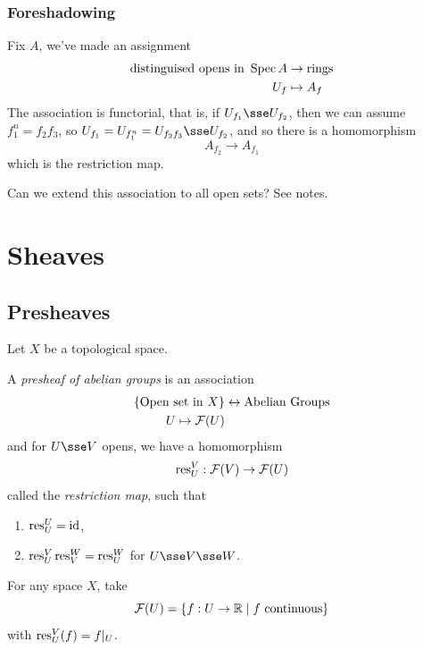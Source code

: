 \documentclass{article}
\begin{document}
\subsubsection*{Foreshadowing}

Fix \(A\), we've made an assignment
\begin{align*}
    \text{distinguised opens in }\operatorname{Spec} A &\to \text{rings} \\
    U_f &\mapsto A_f
\end{align*}
The association is functorial, that is, if \(U_{f_1} \sse U_{f_2}\), then we can assume \(f_1^n = f_2f_3\), so \(U_{f_1} = U_{f_1^n} = U_{f_2f_3} \sse U_{f_2}\), and so there is a homomorphism
\[A_{f_2} \to A_{f_1}\]
which is the restriction map.

Can we extend this association to all open sets? See notes.

\section{Sheaves}

\subsection{Presheaves}

Let \(X\) be a topological space.

\begin{definition}
    [presheaf] A \emph{presheaf of abelian groups} is an association
    \begin{align*}
        \left\{\text{Open set in }X\right\} &\leftrightarrow \text{Abelian Groups} \\
        U \mapsto \mathcal{F}(U)
    \end{align*}
    and for \(U \sse V\) opens, we have a homomorphism
    \[\operatorname{res}_U^V : \mathcal{F}(V) \to \mathcal{F}(U)\]
    called the \emph{restriction map}, such that
    \begin{enumerate}
        \item \(\operatorname{res}_U^U = \operatorname{id}\),
        \item \(\operatorname{res}^V_U\operatorname{res}^W_V = \operatorname{res}^W_U\) for \(U \sse V \sse W\).
    \end{enumerate}
\end{definition}

\begin{example}
    For any space \(X\), take
    \[\mathcal{F}(U) = \left\{f : U \to \mathbb{R} \mid f\text{ continuous}\right\}\]
    with \(\operatorname{res}^V_U(f) = f\vert_U\).
\end{example}
\end{document}
